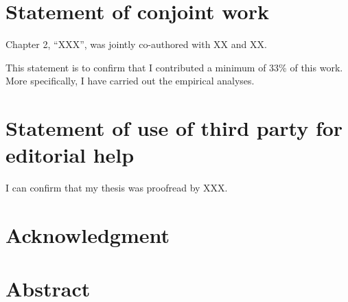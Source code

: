 \documentclass[12pt]{article}
\begin{document}
\newpage


\section*{\textbf{\Large{Statement of conjoint work}}}

\bigskip\bigskip\bigskip\bigskip

Chapter 2, ``XXX'', was jointly co-authored with XX and XX.

This statement is to confirm that I contributed a minimum of 33\% of this work. More specifically, I have carried out the empirical analyses. 

\bigskip
\bigskip
\bigskip
\bigskip 
\bigskip
\bigskip
\bigskip
\bigskip
\bigskip



\section*{\textbf{\Large{Statement of use of third party for editorial help }}}

\bigskip\bigskip\bigskip\bigskip

I can confirm that my thesis was proofread by XXX. 



\newpage \onehalfspacing


\section*{\textbf{\Large{Acknowledgment}}}

\bigskip\bigskip\bigskip\bigskip



\newpage


\section*{\textbf{\Large{Abstract}}}

\bigskip\bigskip\bigskip\bigskip\




\newpage




\tableofcontents


\newpage


\listoftables
\end{document}
